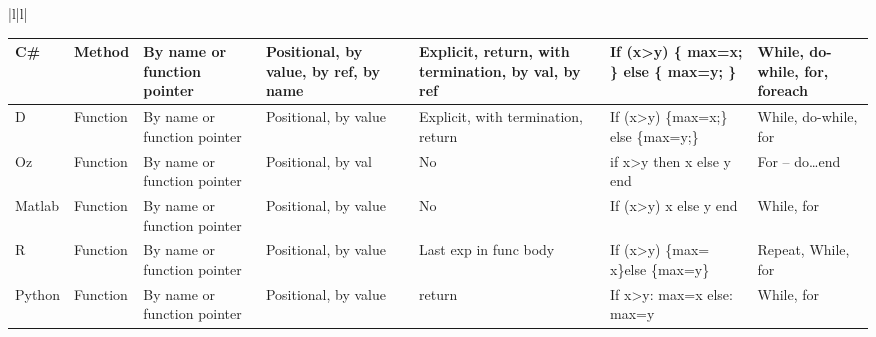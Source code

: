 \documentclass{sig-alternate}
\begin{document}
\begin{table}[]
\begin{tabular}{|l|l|}
{\begin{sidewaystable}
\begin{tabular}{|l|l|l|l|l|l|l|}
C\#                & Method                      & By name or function pointer & Positional, by value, by ref, by name & Explicit, return, with termination, by val, by ref & If (x\textgreater{}y) \{ max=x; \} else \{ max=y; \} & While, do-while, for, foreach \\ \hline
D                  & Function                    & By name or function pointer & Positional, by value                  & Explicit, with termination, return                 & If (x\textgreater{}y) \{max=x;\} else \{max=y;\}     & While, do-while, for          \\ \hline
Oz                 & Function                    & By name or function pointer & Positional, by val                    & No                                                 & if x\textgreater{}y then x else y end                & For – do…end                  \\ \hline
Matlab             & Function                    & By name or function pointer & Positional, by value                  & No                                                 & If (x\textgreater{}y) x else y end                   & While, for                    \\ \hline
R                  & Function                    & By name or function pointer & Positional, by value                  & Last exp in func body                              & If (x\textgreater{}y) \{max= x\}else \{max=y\}       & Repeat, While, for            \\ \hline
Python             & Function                    & By name or function pointer & Positional, by value                  & return                                             & If x\textgreater{}y: max=x else: max=y               & While, for                    \\ \hline

\end{tabular}    

\end{sidewaystable}
}

\end{tabular}
\end{table}
\end{document}
